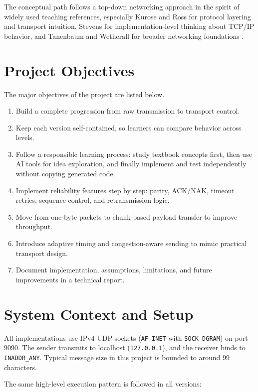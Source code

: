 The conceptual path follows a top-down networking approach in the spirit of
widely used teaching references, especially Kurose and Ross for protocol
layering and transport intuition, Stevens for implementation-level thinking
about TCP/IP behavior, and Tanenbaum and Wetherall for broader networking
foundations \cite{kurose_ross,stevens_tcpip,tanenbaum_wetherall,rfc793,rfc6298,rfc5681,rfc2018,rfc7323,rfc768,beej_guide}.

\clearpage
\section{Project Objectives}
The major objectives of the project are listed below.

\begin{enumerate}
	\item Build a complete progression from raw transmission to transport
	control.
	\item Keep each version self-contained, so learners can compare behavior
	across levels.
	\item Follow a responsible learning process: study textbook concepts first,
	then use AI tools for idea exploration, and finally implement and test
	independently without copying generated code.
	\item Implement reliability features step by step: parity, ACK/NAK,
	timeout retries, sequence control, and retransmission logic.
	\item Move from one-byte packets to chunk-based payload transfer to improve
	throughput.
	\item Introduce adaptive timing and congestion-aware sending to mimic
	practical transport design.
	\item Document implementation, assumptions, limitations, and future
	improvements in a technical report.
\end{enumerate}

	\clearpage
\section{System Context and Setup}
All implementations use IPv4 UDP sockets (\texttt{AF\_INET} with
\texttt{SOCK\_DGRAM}) on port 9090. The sender transmits to localhost
(\texttt{127.0.0.1}), and the receiver binds to \texttt{INADDR\_ANY}. Typical
message size in this project is bounded to around 99 characters.

The same high-level execution pattern is followed in all versions:

